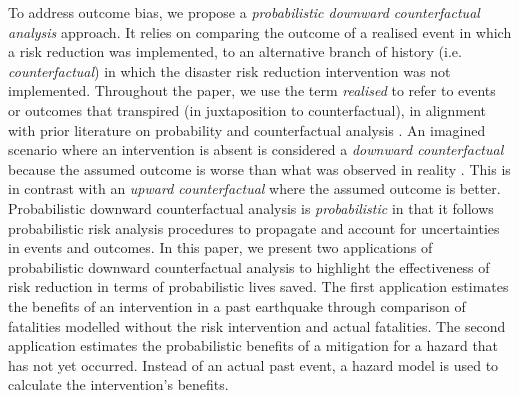 \documentclass[utf8]{frontiersSCNS} %
\begin{document}
To address outcome bias, we propose a \textit{probabilistic downward counterfactual analysis} approach. It relies on comparing the outcome of a realised event in which a risk reduction was implemented, to an alternative branch of history (i.e. \textit{counterfactual}) in which the disaster risk reduction intervention was not implemented.  Throughout the paper, we use the term \textit{realised}  to refer to events or outcomes that transpired (in juxtaposition to counterfactual), in alignment with prior literature on probability and counterfactual analysis \citep{roese1997counterfactual}.  An imagined scenario where an intervention is absent is considered a \textit{downward counterfactual} because the assumed outcome is worse than what was observed in reality \citep{roese1997counterfactual}.  This is in contrast with an \textit{upward counterfactual} where the assumed outcome is better. Probabilistic downward counterfactual analysis is \textit{probabilistic} in that it follows probabilistic risk analysis procedures to propagate and account for uncertainties in events and outcomes. In this paper, we present two applications of probabilistic downward counterfactual analysis to highlight the effectiveness of risk reduction in terms of probabilistic lives saved. The first application estimates the benefits of an intervention in a past earthquake through comparison of fatalities modelled without the risk intervention and actual fatalities. The second application estimates the probabilistic benefits of a mitigation for a hazard that has not yet occurred. Instead of an actual past event, a hazard model is used to calculate the intervention's benefits.
\end{document}
